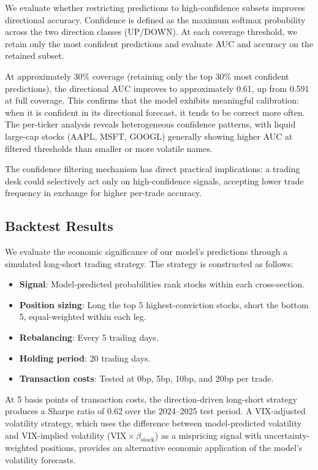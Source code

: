 \documentclass[12pt, a4paper]{article}
\begin{document}
We evaluate whether restricting predictions to high-confidence subsets improves directional accuracy. Confidence is defined as the maximum softmax probability across the two direction classes (UP/DOWN). At each coverage threshold, we retain only the most confident predictions and evaluate AUC and accuracy on the retained subset.

At approximately 30\% coverage (retaining only the top 30\% most confident predictions), the directional AUC improves to approximately 0.61, up from 0.591 at full coverage. This confirms that the model exhibits meaningful calibration: when it is confident in its directional forecast, it tends to be correct more often. The per-ticker analysis reveals heterogeneous confidence patterns, with liquid large-cap stocks (AAPL, MSFT, GOOGL) generally showing higher AUC at filtered thresholds than smaller or more volatile names.

The confidence filtering mechanism has direct practical implications: a trading desk could selectively act only on high-confidence signals, accepting lower trade frequency in exchange for higher per-trade accuracy.

\subsection{Backtest Results}

We evaluate the economic significance of our model's predictions through a simulated long-short trading strategy. The strategy is constructed as follows:

\begin{itemize}[noitemsep]
    \item \textbf{Signal}: Model-predicted probabilities rank stocks within each cross-section.
    \item \textbf{Position sizing}: Long the top 5 highest-conviction stocks, short the bottom 5, equal-weighted within each leg.
    \item \textbf{Rebalancing}: Every 5 trading days.
    \item \textbf{Holding period}: 20 trading days.
    \item \textbf{Transaction costs}: Tested at 0bp, 5bp, 10bp, and 20bp per trade.
\end{itemize}

At 5 basis points of transaction costs, the direction-driven long-short strategy produces a Sharpe ratio of 0.62 over the 2024--2025 test period. A VIX-adjusted volatility strategy, which uses the difference between model-predicted volatility and VIX-implied volatility ($\text{VIX} \times \beta_{\text{stock}}$) as a mispricing signal with uncertainty-weighted positions, provides an alternative economic application of the model's volatility forecasts.
\end{document}
